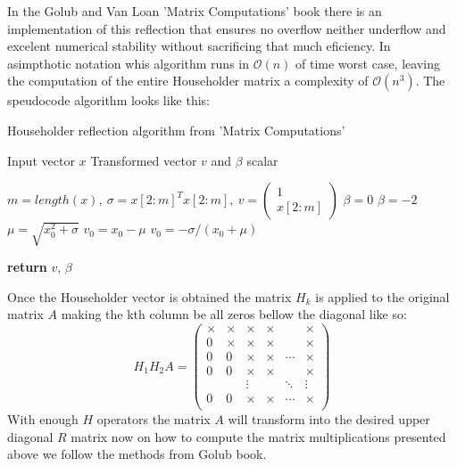 \documentclass{scrartcl}
\begin{document}
  In the Golub and Van Loan 'Matrix Computations' book there is an implementation of this reflection that ensures no overflow neither underflow and excelent numerical stability without sacrificing that much eficiency. In asimpthotic notation whis algorithm runs in $\mathcal{O}(n)$ of time worst case, leaving the computation of the entire Householder matrix a complexity of $\mathcal{O}(n^3)$. The speudocode algorithm looks like this:

\begin{algorithm}[H]
    \caption{Householder reflection algorithm from 'Matrix Computations'}
    \label{alg:householder_reflection}
    \begin{algorithmic}[0]
        \REQUIRE Input vector $x$
        \ENSURE Transformed vector $v$ and $\beta$ scalar

        \STATE $m = length(x),\ \sigma = x[2:m]^T x[2:m],\ v = \begin{pmatrix} 1 \\ x[2:m] \end{pmatrix}$
            \STATE $\beta = 0$
            \STATE $\beta = -2$
        \ELSE
            \STATE $\mu = \sqrt{x_0^2 + \sigma}$
                \STATE $v_0 = x_0 - \mu$
            \ELSE
                \STATE $v_0 = -\sigma / (x_0 + \mu)$
            \ENDIF
        \ENDIF

        \STATE \textbf{return} $v$, $\beta$
    \end{algorithmic}
\end{algorithm}

Once the Householder vector is obtained the matrix $H_k$ is applied to the original matrix $A$ making the kth column be all zeros bellow the diagonal like so:
\[ 
    H_1 H_2 A = \begin{pmatrix}
   \times & \times     & \times & \times & & \times \\
        0 &     \times & \times & \times & & \times \\
        0 & 0 & \times & \times & \cdots & \times \\
        0 & 0 & \times & \times &        & \times \\
          &   & \vdots &        & \ddots & \vdots \\
        0 & 0 & \times & \times & \cdots & \times \\
                \end{pmatrix}
\]
With enough $H$ operators the matrix $A$ will transform into the desired upper diagonal $R$ matrix now on how to compute the matrix multiplications presented above we follow the methods from Golub book.
\end{document}
